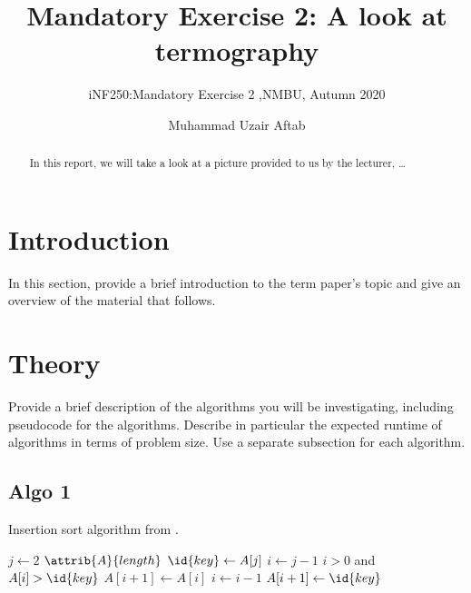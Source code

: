 \documentclass[sigconf, nonacm, screen, balance=False]{acmart}
\begin{document}
\title{Mandatory Exercise 2: A look at termography }
\subtitle{iNF250:Mandatory Exercise 2 ,NMBU, Autumn 2020}

\author{Muhammad Uzair Aftab}

\begin{abstract}
  In this report, we will take a look at a picture provided to us by the lecturer, \dots 
\end{abstract}




\maketitle

\section{Introduction}\label{sec:intro}

In this section, provide a brief introduction to the term paper's
topic and give an overview of the material that follows.

\section{Theory}\label{sec:theory}

Provide a brief description of the algorithms you will be
investigating, including pseudocode for the algorithms. Describe in
particular the expected runtime of algorithms in terms of problem
size.  Use a separate subsection for each algorithm.

\subsection{Algo 1}\label{sec:algo1}

\begin{listing}
  \caption{Insertion sort algorithm from \citet[Ch.~2.1]{CLRS_2009}.}
  \label{lst:insertion_algo}
  \begin{codebox}
    \li \For $j \gets 2$ \To $\attrib{A}{length}$
    \li \Do
    $\id{key} \gets A[j]$
    \li     $i \gets j-1$
    \li      \While $i>0$ and $A[i] > \id{key}$
    \li      \Do
    $A[i+1] \gets A[i]$
    \li         $i \gets i-1$
    \End    
    \li       $A[i+1]\gets \id{key}$
    \End
  \end{codebox}
\end{listing}
\end{document}
